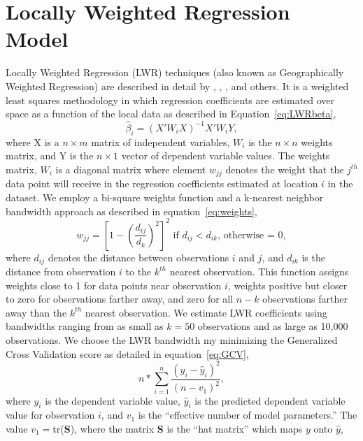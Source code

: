 \documentclass{article}\usepackage{graphicx, color}
\begin{document}
\section{Locally Weighted Regression Model}
Locally Weighted Regression (LWR) techniques (also known as Geographically Weighted Regression) are described in detail by \citet{Cleveland1988}, \citet{Brunsdon1998b}, \citet{Fotheringham2002}, and others. It is a weighted least squares methodology in which regression coefficients are estimated over space as a function of the local data as described in Equation~\eqref{eq:LWRbeta},
\begin{equation}\label{eq:LWRbeta}
\hat{\beta}_i = (X'W_iX)^{-1}X'W_iY,
\end{equation}
where X is a $n \times m$ matrix of independent variables, $W_i$ is the $n \times n$ weights matrix, and Y is the $n \times 1$ vector of dependent variable values. The weights matrix, $W_i$ is a diagonal matrix where element $w_{jj}$ denotes the weight that the $j^{th}$ data point will receive in the regression coefficients estimated at location $i$ in the dataset. We employ a bi-square weights function and a k-nearest neighbor bandwidth approach as described in equation~\eqref{eq:weights}, 
\begin{equation}\label{eq:weights}
w_{jj}=\left[1-\left(\frac{d_{ij}}{d_{k}}\right)^2 \right]^2 \textrm{ if  }d_{ij}<d_{ik}\textrm{, otherwise = 0},
\end{equation}
where $d_{ij}$ denotes the distance between observations $i$ and $j$, and $d_{ik}$ is the distance from observation $i$ to the $k^{th}$ nearest observation. This function assigns weights close to 1 for data points near observation $i$, weights positive but closer to zero for observations farther away, and zero for all $n-k$ observations farther away than the $k^{th}$ nearest observation. We estimate LWR coefficients using bandwidths ranging from as small as $k=50$ observations and as large as 10,000 observations. We choose the LWR bandwidth my minimizing the Generalized Cross Validation score as detailed in equation~\eqref{eq:GCV},
\begin{equation}\label{eq:GCV}
n*\sum_{i=1}^{n}\frac{(y_i-\hat{y}_i)^2}{(n-v_1)^2}, 
\end{equation} 
where $y_i$ is the dependent variable value, $\hat{y}_i$ is the predicted dependent variable value for observation $i$, and $v_1$ is the ``effective number of model parameters.'' The value  
$v_1=$tr(\textbf{S}), where the matrix \textbf{S} is the ``hat matrix'' which maps $y$ onto $\hat{y}$,
\end{document}
